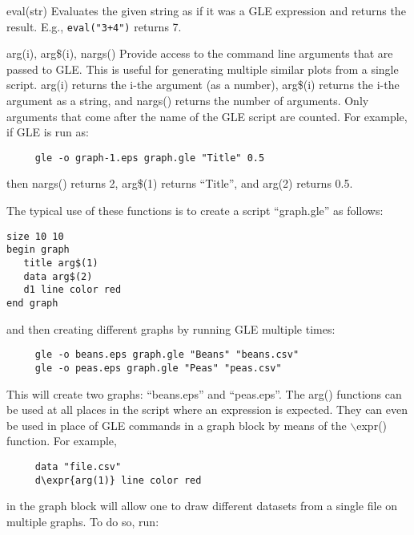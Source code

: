 \begin{commanddescription}

\item[{\sf eval(str)}]
Evaluates the given string as if it was a GLE expression and returns the result. E.g., \texttt{eval("3+4")} returns 7.

\item[{\sf arg(i), arg\$(i), nargs()}]
\label{args:cmd}
Provide access to the command line arguments that are passed to GLE. This is useful for generating multiple similar plots from a single script. arg(i) returns the i-the argument (as a number), arg\$(i) returns the i-the argument as a string, and nargs() returns the number of arguments. Only arguments that come after the name of the GLE script are counted. For example, if GLE is run as:

\begin{Verbatim}
     gle -o graph-1.eps graph.gle "Title" 0.5
\end{Verbatim}

\noindent{}then nargs() returns 2, arg\$(1) returns ``Title'', and arg(2) returns 0.5.

The typical use of these functions is to create a script ``graph.gle'' as follows:

\begin{Verbatim}
size 10 10
begin graph
   title arg$(1)
   data arg$(2)
   d1 line color red
end graph
\end{Verbatim}

\noindent{}and then creating different graphs by running GLE multiple times:

\begin{Verbatim}
     gle -o beans.eps graph.gle "Beans" "beans.csv"
     gle -o peas.eps graph.gle "Peas" "peas.csv"
\end{Verbatim}

\noindent{}This will create two graphs: ``beans.eps'' and ``peas.eps''. The arg() functions can be used at all places in the script where an expression is expected. They can even be used in place of GLE commands in a graph block by means of the $\backslash{}$expr() function. For example,

\begin{Verbatim}
     data "file.csv"
     d\expr{arg(1)} line color red
\end{Verbatim}

\noindent{}in the graph block will allow one to draw different datasets from a single file on multiple graphs. To do so, run:


\end{commanddescription}
